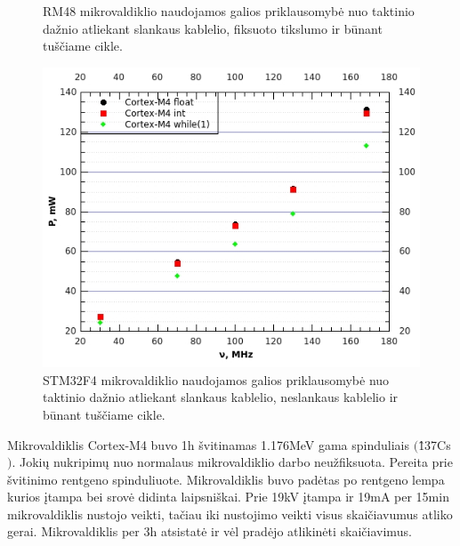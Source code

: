 \documentclass[a4paper, 12pt]{article} %
\begin{document}
\begin{onehalfspacing}
\begin{figure}[H]
\captionsetup{labelformat=numbfirst} %
\captionsetup{labelseparator=tarpas}
\caption{RM48 mikrovaldiklio naudojamos galios priklausomyb\.e nuo taktinio da\v{z}nio atliekant slankaus kablelio, fiksuoto tikslumo ir b\=unant tu\v{s}\v{c}iame cikle.}
\label{vienas}
\end{figure}
\begin{figure}[H] %
\centering %
\includegraphics[scale=0.8]{pav/M4galia.jpg} %
\captionsetup{labelformat=numbfirst} %
\captionsetup{labelseparator=tarpas}
\caption{STM32F4 mikrovaldiklio naudojamos galios priklausomyb\.e nuo taktinio da\v{z}nio atliekant slankaus kablelio, neslankaus kablelio ir b\=unant tu\v{s}\v{c}iame cikle.}
\label{vienas}
\end{figure}
Mikrovaldiklis Cortex-M4 buvo 1h \v{s}vitinamas 1.176MeV gama spinduliais $($\^{137}Cs$)$. Joki\k{u} nukripim\k{u} nuo normalaus mikrovaldiklio darbo neu\v{z}fiksuota.
Pereita prie \v{s}vitinimo rentgeno spinduliuote. Mikrovaldiklis buvo pad\.{e}tas po rentgeno lempa kurios \k{i}tampa bei srov\.{e} didinta laipsni\v{s}kai. Prie 19kV \k{i}tampa ir 19mA per 15min mikrovaldiklis nustojo veikti, ta\v{c}iau iki nustojimo veikti visus skai\v{c}iavumus atliko gerai. Mikrovaldiklis per 3h atsistat\.{e} ir v\.{e}l prad\.{e}jo atlikin\.{e}ti skai\v{c}iavimus.
\newpage

\end{onehalfspacing}
\end{document}
